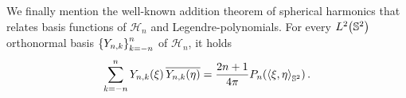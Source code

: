 We finally mention the well-known addition theorem of
spherical harmonics that relates basis functions of
$\mathcal{H}_n$ and Legendre-polynomials.
For every $L^2{\hspace{-0.4ex}}\left(\mathbb{S}^2\right)$ orthonormal basis
$\left\{Y_{n,k}\right\rbrace_{k=-n}^{n}$ of $\mathcal{H}_n$, it holds
\begin{equation}
\label{AdditionTheorem}
  \sum_{k=-n}^{n} Y_{n,k}{\hspace{-0.4ex}}\left(\mathbf{\xi}\right)
  \overline{Y_{n,k}{\hspace{-0.4ex}}\left(\mathbf{\eta}\right)} =
  \frac{2n+1}{4\pi}P_n{\hspace{-0.4ex}}\left(\left<\mathbf{\xi},\mathbf{\eta}\right>_{\mathbb{S}^2}\right).
\end{equation}

